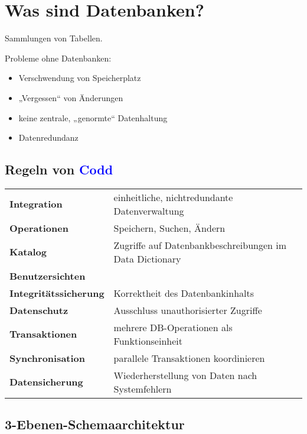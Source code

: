 \documentclass{scrartcl}
\newcommand{\key}[1]{{\textcolor{blue}{\textbf{#1}}}}
\begin{document}
%

\section{Was sind Datenbanken?}

Sammlungen von Tabellen.

Probleme ohne Datenbanken:
\begin{itemize}
	\itemsep0em
	\item Verschwendung von Speicherplatz
	\item „Vergessen“ von Änderungen
	\item keine zentrale, „genormte“ Datenhaltung
	\item Datenredundanz
\end{itemize}

\subsection{Regeln von \key{Codd}}

\begin{tabular}{ll}
	\textbf{Integration} & einheitliche, nichtredundante Datenverwaltung \\
	\textbf{Operationen} & Speichern, Suchen, Ändern \\
	\textbf{Katalog} & Zugriffe auf Datenbankbeschreibungen im Data Dictionary \\
	\textbf{Benutzersichten} & \\
	\textbf{Integritätssicherung} & Korrektheit des Datenbankinhalts \\
	\textbf{Datenschutz} & Ausschluss unauthorisierter Zugriffe \\
	\textbf{Transaktionen} & mehrere DB-Operationen als Funktionseinheit \\
	\textbf{Synchronisation} & parallele Transaktionen koordinieren \\
	\textbf{Datensicherung} & Wiederherstellung von Daten nach Systemfehlern \\
\end{tabular}

\subsection{3-Ebenen-Schemaarchitektur}
\end{document}

